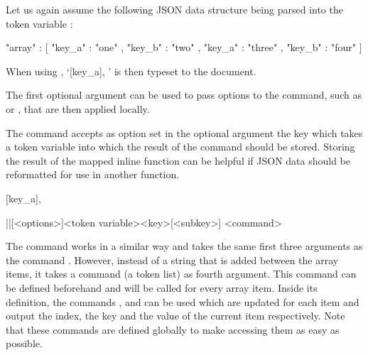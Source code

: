 \documentclass[a4paper]{article}
\begin{document}
{{Let us again assume the following JSON data structure being parsed into the token variable \macro{\myJSONdata}:

\begin{codeexample}
{
  "array" : [
    {
      "key_a" : "one" ,
      "key_b" : "two"
    } ,
    {
      "key_a" : "three" ,
      "key_b" : "four"
    }
  ]
}
\end{codeexample}

When using , `[key_a]{, }' is then typeset to the document.

The first optional argument can be used to pass options to the command, such as  or , that are then applied locally.

The command \macro{\JSONParseArrayUse} accepts as option set in the optional argument the key  which takes a token variable into which the result of the command should be stored. Storing the result of the mapped inline function can be helpful if JSON data should be reformatted for use in another function.

\begin{codeexamplecolumns}
[key_a]{,}

\end{codeexamplecolumns}

\begin{macrodef}
|\JSONParseArrayMapFunction|[<options>]{<token variable>}{<key>}[<subkey>]
  {<command>}
\end{macrodef}
The command \macro{\JSONParseArrayMapFunction} works in a similar way and takes the same first three arguments as the command \macro{\JSONParseArrayUse}. However, instead of a string that is added between the array items, it takes a command (a token list) as fourth argument. This command can be defined beforehand and will be called for every array item. Inside its definition, the commands \macro{\JSONParseArrayIndex}, \macro{\JSONParseArrayKey} and \macro{\JSONParseArrayValue} can be used which are updated for each item and output the index, the key and the value of the current item respectively. Note that these commands are defined globally to make accessing them as easy as possible.

}}
\end{document}
